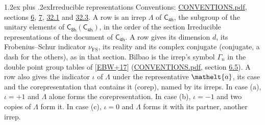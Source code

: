 \documentclass[10pt,a4paper]{article}
\makeatletter
\renewcommand\section{\@startsection{section}{1}{\z@}{-3ex plus -1ex minus -.2ex}%
  {1.2ex plus .2ex}{\normalfont\large\sffamily\bfseries\color{parttitle}}}
\numberwithin{equation}{section}
\newcommand{\eltfont}[1]{{\let\sigma\eltsigma\mathelt{#1}}}
\newcommand{\grp}[1]{\mathsf{#1}}
\newcommand{\elt}[1]{\eltfont{#1}}
\newcommand{\fsind}{\nu_{\mathrm{FS}}}
\makeatother
\begin{document}
\section{Irreducible representations}\label{s:irreps}
Conventions: \href{../../CONVENTIONS.pdf}{CONVENTIONS.pdf}, sections \href{../../../rotation/CONVENTIONS.pdf\#conv.6}{6}, \href{../../../rotation/CONVENTIONS.pdf\#conv.7}{7}, \href{../../CONVENTIONS.pdf\#conv.32.1}{32.1} and \href{../../CONVENTIONS.pdf\#conv.32.3}{32.3}.
\leavevmode\label{n:irrep.Delta}A row is an irrep $\Lambda$ of $\grp{C_{4h}}$, the subgroup of the unitary elements of $\grp{C_{8h}}(\grp{C_{4h}})$, in the order of the section Irreducible representations of the document of \href{../../../rotation/data/pdf/C4h.pdf}{$\grp{C_{4h}}$}. \label{n:index.dimension}\label{n:index.frobenius}\label{n:head.irrep}\label{n:head.reality}\label{n:head.conjugate}A row gives its dimension $d$, its Frobenius--Schur indicator $\fsind$, its reality and its complex conjugate (conjugate, a dash for the others), as in that section. \label{n:head.bilbao}\label{n:irrep.alias.gamma}Bilbao is the irrep's symbol $\Gamma_n$ in the double point group tables of [\href{../../../REFERENCES.pdf\#ref.EBW+17}{EBW+17}] (\href{../../CONVENTIONS.pdf}{CONVENTIONS.pdf}, section \href{../../../rotation/CONVENTIONS.pdf\#conv.6.5}{6.5}). \label{n:head.case.corep}\label{n:head.corep}A row also gives the indicator $\iota$ of $\Lambda$ under the representative $\elt{a}$, its case and the corepresentation that contains it (corep), named by its irreps. In case (a), $\iota = +1$ and $\Lambda$ alone forms the corepresentation. In case (b), $\iota = -1$ and two copies of $\Lambda$ form it. In case (c), $\iota = 0$ and $\Lambda$ forms it with its partner, another irrep.
\setlength{\emergencystretch}{2em}\par\setlength{\emergencystretch}{0pt}
\end{document}
